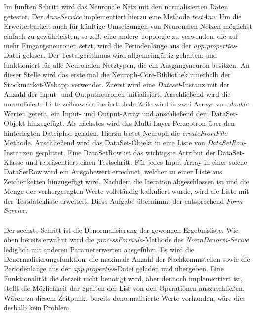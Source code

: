 Im fünften Schritt wird das Neuronale Netz mit den normalisierten Daten getestet. Der \emph{Ann-Service} implementiert hierzu eine Methode \emph{testAnn}. Um die Erweiterbarkeit auch für künftige Umsetzungen von Neuronalen Netzen möglichst einfach zu gewährleisten, so z.B. eine andere Topologie zu verwenden, die auf mehr Eingangsneuronen setzt, wird die Periodenlänge aus der \emph{app.properties}-Datei gelesen. Der Testalgorithmus wird allgemeingültig gehalten, und funktioniert für alle Neuronalen Netztypen, die ein Ausgangsneuron besitzen. 
An dieser Stelle wird das erste mal die Neuroph-Core-Bibliothek innerhalb der Stockmarket-Webapp verwendet. 
Zuerst wird eine \emph{Dataset}-Instanz mit der Anzahl der Input- und Outputneuronen initialisiert.
Anschließend wird die normalisierte Liste zeilenweise iteriert. Jede Zeile wird in zwei Arrays von \emph{double}-Werten geteilt, ein Input- und Output-Array und anschließend dem DataSet-Objekt hinzugefügt.
Als nächstes wird das Multi-Layer-Perzeptron über den hinterlegten Dateipfad geladen. Hierzu bietet Neuroph die \emph{createFromFile}-Methode.
Anschließend wird das DataSet-Objekt in eine Liste von \emph{DataSetRow}-Instanzen gesplittet. Eine DataSetRow ist das wichtigste Attribut der DataSet-Klasse und repräsentiert einen Testschritt. Für jedes Input-Array in einer solche DataSetRow wird ein Ausgabewert errechnet, welcher zu einer Liste aus Zeichenketten hinzugefügt wird.
Nachdem die Iteration abgeschlossen ist und die Menge der vorhergesagten Werte vollständig kalkuliert wurde, wird die Liste mit der Testdatenliste erweitert. Diese Aufgabe übernimmt der entsprechend \emph{Form-Service}.\\\\

Der sechste Schritt ist die Denormalisierung der gewonnen Ergebnisliste. Wie oben bereits erwähnt wird die \emph{processFormula}-Methode des \emph{NormDenorm-Serive} lediglich mit anderen Parameterwerten ausgeführt. Es wird die Denormalisierungsfunktion, die maximale Anzahl der Nachkommstellen sowie die Periodenlänge aus der \emph{app.properties}-Datei geladen und übergeben. Eine Funktionalität die derzeit nicht benötigt wird, aber dennoch implementiert ist, stellt die Möglichkeit dar Spalten der List von den Operationen auszuschließen. Wären zu diesem Zeitpunkt bereits denormalisierte Werte vorhanden, wäre dies deshalb kein Problem.

